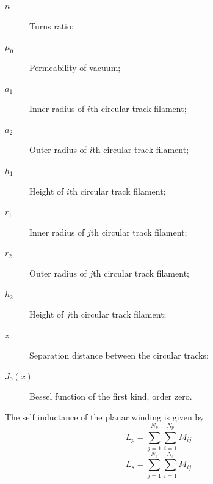 \documentclass[conference]{IEEEtran}
\begin{document}
\begin{description}
\item[\hspace{-10pt}$ n $]        \hspace{-15pt} Turns ratio;
\item[\hspace{-10pt}$ \mu_{0} $]  \hspace{-15pt} Permeability of vacuum;
\item[\hspace{-10pt}$ a_{1} $]    \hspace{-15pt} Inner radius of $i$th circular track filament;
\item[\hspace{-10pt}$ a_{2} $]    \hspace{-15pt} Outer radius of $i$th circular track filament;
\item[\hspace{-10pt}$ h_{1} $]    \hspace{-15pt} Height of $i$th circular track filament;
\item[\hspace{-10pt}$ r_{1} $]    \hspace{-15pt} Inner radius of $j$th circular track filament;
\item[\hspace{-10pt}$ r_{2} $]    \hspace{-15pt} Outer radius of $j$th circular track filament;
\item[\hspace{-10pt}$ h_{2} $]    \hspace{-15pt} Height of $j$th circular track filament;
\item[\hspace{-10pt}$ z $]        \hspace{-15pt} Separation distance between the circular tracks;
\item[\hspace{-10pt}$ J_{0}(x) $] \hspace{-15pt} Bessel function of the first kind, order zero.
\end{description}

\hspace{-20pt} The self inductance of the planar winding \cite{HurleyDuffy} is given by
\begin{equation}
	L_{p} = \sum\limits_{j=1}^{N_{p}}{\sum\limits_{i=1}^{N_{p}}{M_{ij}}}
\end{equation}
%
\begin{equation}
	L_{s} = \sum\limits_{j=1}^{N_{s}}{\sum\limits_{i=1}^{N_{s}}{M_{ij}}}
\end{equation}
\end{document}

